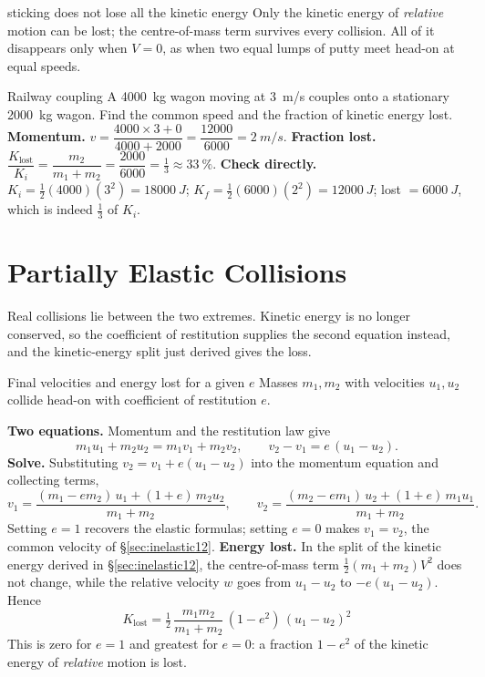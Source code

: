\begin{trapbox}{sticking does not lose all the kinetic energy}
Only the kinetic energy of \emph{relative} motion can be lost; the centre-of-mass term survives every
collision. All of it disappears only when $V=0$, as when two equal lumps of putty meet head-on at equal
speeds.
\end{trapbox}


\begin{exbox}{Railway coupling}
A \SI{4000}{kg} wagon moving at \SI{3}{m/s} couples onto a stationary \SI{2000}{kg} wagon. Find the
common speed and the fraction of kinetic energy lost.
 \textbf{Momentum.} $v=\dfrac{4000\times3+0}{4000+2000}=\dfrac{12000}{6000}=\SI{2}{m/s}$.
 \textbf{Fraction lost.} $\dfrac{K_{\text{lost}}}{K_i}=\dfrac{m_2}{m_1+m_2}=\dfrac{2000}{6000}
=\tfrac13\approx\SI{33}{\percent}$.
 \textbf{Check directly.} $K_i=\tfrac12(4000)(3^2)=\SI{18000}{J}$;
$K_f=\tfrac12(6000)(2^2)=\SI{12000}{J}$; lost $=\SI{6000}{J}$, which is indeed $\tfrac13$ of $K_i$.
\end{exbox}

\section{Partially Elastic Collisions}\label{sec:partial12}

Real collisions lie between the two extremes. Kinetic energy is no longer conserved, so the coefficient
of restitution supplies the second equation instead, and the kinetic-energy split just derived gives the
loss.

\begin{derivbox}{Final velocities and energy lost for a given $e$}
Masses $m_1,m_2$ with velocities $u_1,u_2$ collide head-on with coefficient of restitution $e$.

 \textbf{Two equations.} Momentum and the restitution law give
\[
m_1u_1+m_2u_2=m_1v_1+m_2v_2,\qquad v_2-v_1=e\,(u_1-u_2).
\]
 \textbf{Solve.} Substituting $v_2=v_1+e(u_1-u_2)$ into the momentum equation and collecting
terms,
\[
v_1=\frac{(m_1-em_2)\,u_1+(1+e)\,m_2u_2}{m_1+m_2},\qquad
v_2=\frac{(m_2-em_1)\,u_2+(1+e)\,m_1u_1}{m_1+m_2}.
\]
Setting $e=1$ recovers the elastic formulas; setting $e=0$ makes $v_1=v_2$, the common velocity of
\S\ref{sec:inelastic12}.
 \textbf{Energy lost.} In the split of the kinetic energy derived in \S\ref{sec:inelastic12}, the
centre-of-mass term $\tfrac12(m_1+m_2)V^2$ does not change, while the relative velocity $w$ goes from $u_1-u_2$ to $-e(u_1-u_2)$. Hence
\[
\boxed{\;K_{\text{lost}}=\tfrac12\,\frac{m_1m_2}{m_1+m_2}\,(1-e^2)\,(u_1-u_2)^2\;}
\]
This is zero for $e=1$ and greatest for $e=0$: a fraction $1-e^2$ of the kinetic energy of
\emph{relative} motion is lost.
\end{derivbox}

